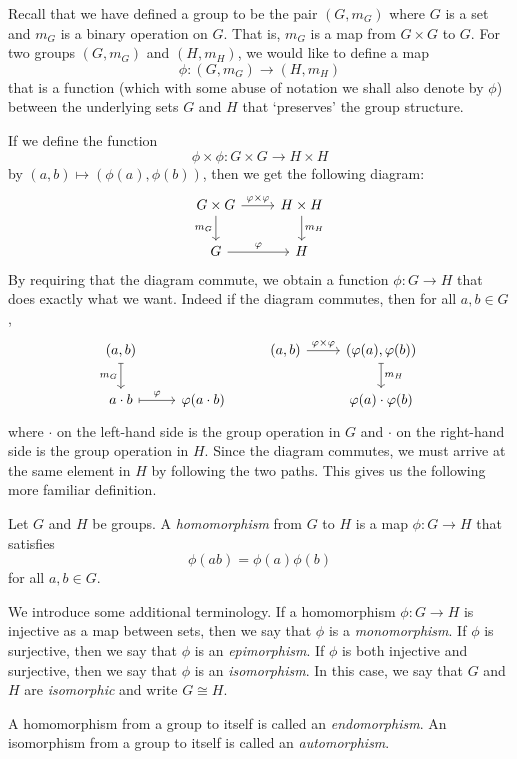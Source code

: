 \begin{sectionthm}
    Recall that we have defined a group to be the pair \((G, m_G)\) where \(G\)
    is a set and \(m_G\) is a binary operation on \(G\). That is, \(m_G\) is a
    map from \(G \times G\) to \(G\). For two groups \((G, m_G)\) and \((H,
    m_H)\), we would like to define a map
    \[
        \phi: (G, m_G) \to (H, m_H)
    \]
    that is a function (which with some abuse of notation we shall also denote
    by \(\phi\)) between the underlying sets \(G\) and \(H\) that `preserves'
    the group structure.

    If we define the function
    \[
        \phi \times \phi: G \times G \to H \times H
    \]
    by \((a, b) \mapsto (\phi(a), \phi(b))\), then we get the following diagram:
    \[
        \begin{tikzcd}
            G \times G \arrow{r}{\phi \times \phi} \arrow[swap]{d}{m_G} & H \times H \arrow{d}{m_H} \\
            G \arrow{r}{\phi} & H
        \end{tikzcd}
    \]
    By requiring that the diagram commute, we obtain a function \(\phi: G \to
    H\) that does exactly what we want. Indeed if the diagram commutes, then for
    all \(a, b \in G\),
    \[
        \begin{tikzcd}
            (a, b) \arrow[swap, mapsto]{d}{m_G} & & (a, b) \arrow{r}{\phi \times \phi} & (\phi(a), \phi(b)) \arrow[mapsto]{d}{m_H} \\
            a\cdot b \arrow[mapsto]{r}{\phi} & \phi(a\cdot b) && \phi(a)\cdot\phi(b)
        \end{tikzcd}
    \]
    where \(\cdot\) on the left-hand side is the group operation in \(G\) and
    \(\cdot\) on the right-hand side is the group operation in \(H\). Since the
    diagram commutes, we must arrive at the same element in \(H\) by following
    the two paths. This gives us the following more familiar definition.
\end{sectionthm}

\begin{definition}
    Let \(G\) and \(H\) be groups. A \emph{homomorphism} from \(G\) to \(H\) is
    a map \(\phi: G \to H\) that satisfies
    \[
        \phi(ab) = \phi(a)\phi(b)
    \]
    for all \(a, b \in G\).

    We introduce some additional terminology. If a homomorphism \(\phi: G \to
    H\) is injective as a map between sets, then we say that \(\phi\) is a
    \emph{monomorphism}. If \(\phi\) is surjective, then we say that \(\phi\) is
    an \emph{epimorphism}. If \(\phi\) is both injective and surjective, then we
    say that \(\phi\) is an \emph{isomorphism}. In this case, we say that \(G\)
    and \(H\) are \emph{isomorphic} and write \(G \cong H\).

    A homomorphism from a group to itself is called an \emph{endomorphism}. An
    isomorphism from a group to itself is called an \emph{automorphism}.
\end{definition}

